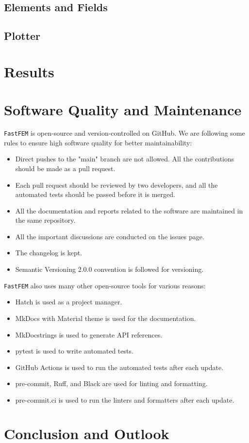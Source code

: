 \documentclass[headings=standardclasses, abstract=true]{scrartcl}
\begin{document}
\subsection{Elements and Fields}

\subsection{Plotter}




\section{Results}

\section{Software Quality and Maintenance}

\texttt{FastFEM} is open-source and version-controlled on GitHub\supercite{fastfem}. We are following some rules to ensure high software quality for better maintainability:

\begin{itemize}
    \item Direct pushes to the "main" branch are not allowed. All the contributions should be made as a pull request.
    \item Each pull request should be reviewed by two developers, and all the automated tests should be passed before it is merged.
    \item All the documentation and reports related to the software are maintained in the same repository.
    \item All the important discussions are conducted on the issues page.
    \item The changelog is kept.
    \item Semantic Versioning 2.0.0\supercite{semanticVersioning} convention is followed for versioning.
\end{itemize}

\texttt{FastFEM} also uses many other open-source tools for various reasons:
\begin{itemize}
    \item Hatch\supercite{hatch} is used as a project manager.
    \item MkDocs\supercite{mkdocs} with Material theme\supercite{mkdocsmaterial} is used for the documentation.
    \item MkDocstrings\supercite{mkdocstrings} is used to generate API references.
    \item pytest\supercite{pytest} is used to write automated tests.
    \item GitHub Actions\supercite{githubactions} is used to run the automated tests after each update.
    \item pre-commit\supercite{precommit}, Ruff\supercite{ruff}, and Black\supercite{black} are used for linting and formatting.
    \item pre-commit.ci is used to run the linters and formatters after each update.
\end{itemize}


\section{Conclusion and Outlook}

\clearpage
\printbibliography
\end{document}
